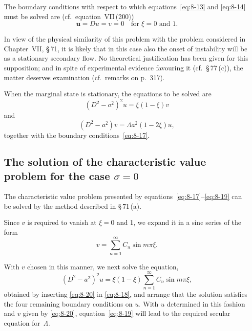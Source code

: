 The boundary conditions with respect to which equations~\eqref{eq:8-13} and \eqref{eq:8-14} must be solved are (cf.\ equation~VII\,(200))
\begin{equation}
\label{eq:8-17}
\mathbf{u} = Du = v = 0 \quad \text{for } \xi = 0 \text{ and } 1.
\end{equation}

In view of the physical similarity of this problem with the problem considered in Chapter~VII, \S\,71, it is likely that in this case also the onset of instability will be as a stationary secondary flow. No theoretical justification has been given for this supposition; and in spite of experimental evidence favouring it (cf.\ \S\,77\,(c)), the matter deserves examination (cf.\ remarks on p.~317).

When the marginal state is stationary, the equations to be solved are
\begin{equation}
\label{eq:8-18}
(D^2 - a^2)^2 u = \xi(1-\xi)v
\end{equation}
and
\begin{equation}
\label{eq:8-19}
(D^2 - a^2)v = \Lambda a^2(1-2\xi)u,
\end{equation}
together with the boundary conditions~\eqref{eq:8-17}.

\subsection{The solution of the characteristic value problem for the case $\sigma = 0$}
\label{sec:76b}

The characteristic value problem presented by equations~\eqref{eq:8-17}--\eqref{eq:8-19} can be solved by the method described in \S\,71\,(a).

Since $v$ is required to vanish at $\xi = 0$ and 1, we expand it in a sine series of the form
\begin{equation}
\label{eq:8-20}
v = \sum_{n=1}^{\infty} C_n \sin m\pi\xi.
\end{equation}

With $v$ chosen in this manner, we next solve the equation,
\begin{equation}
\label{eq:8-21}
(D^2 - a^2)^2 u = \xi(1-\xi)\sum_{n=1}^{\infty} C_n \sin m\pi\xi,
\end{equation}
obtained by inserting \eqref{eq:8-20} in \eqref{eq:8-18}, and arrange that the solution satisfies the four remaining boundary conditions on $u$. With $u$ determined in this fashion and $v$ given by \eqref{eq:8-20}, equation~\eqref{eq:8-19} will lead to the required secular equation for~$\Lambda$.


